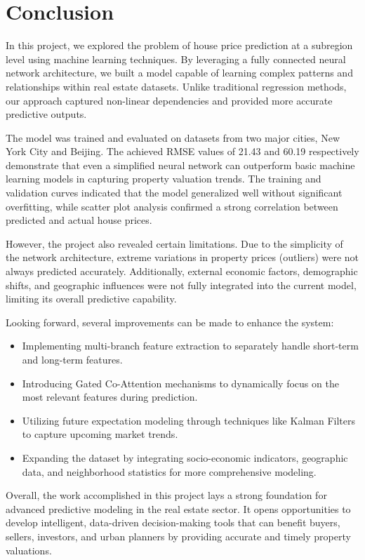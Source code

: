 \chapter{Conclusion}

In this project, we explored the problem of house price prediction at a subregion level using machine learning techniques. By leveraging a fully connected neural network architecture, we built a model capable of learning complex patterns and relationships within real estate datasets. Unlike traditional regression methods, our approach captured non-linear dependencies and provided more accurate predictive outputs.

The model was trained and evaluated on datasets from two major cities, New York City and Beijing. The achieved RMSE values of 21.43 and 60.19 respectively demonstrate that even a simplified neural network can outperform basic machine learning models in capturing property valuation trends. The training and validation curves indicated that the model generalized well without significant overfitting, while scatter plot analysis confirmed a strong correlation between predicted and actual house prices.

However, the project also revealed certain limitations. Due to the simplicity of the network architecture, extreme variations in property prices (outliers) were not always predicted accurately. Additionally, external economic factors, demographic shifts, and geographic influences were not fully integrated into the current model, limiting its overall predictive capability.

Looking forward, several improvements can be made to enhance the system:
\begin{itemize}
    \item Implementing multi-branch feature extraction to separately handle short-term and long-term features.
    \item Introducing Gated Co-Attention mechanisms to dynamically focus on the most relevant features during prediction.
    \item Utilizing future expectation modeling through techniques like Kalman Filters to capture upcoming market trends.
    \item Expanding the dataset by integrating socio-economic indicators, geographic data, and neighborhood statistics for more comprehensive modeling.
\end{itemize}

Overall, the work accomplished in this project lays a strong foundation for advanced predictive modeling in the real estate sector. It opens opportunities to develop intelligent, data-driven decision-making tools that can benefit buyers, sellers, investors, and urban planners by providing accurate and timely property valuations.
